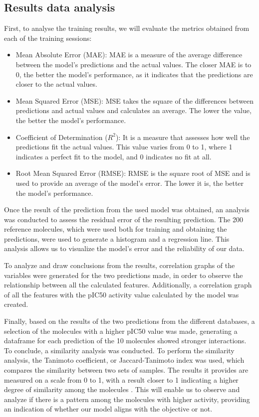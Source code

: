 \documentclass[final,times,twocolumn,article]{elsarticle}
\begin{document}
\subsection{Results data analysis}

First, to analyse the training results, we will evaluate the metrics obtained from each of the training sessions:

\begin{itemize}
    \item Mean Absolute Error (MAE): MAE is a measure of the average difference between the model's predictions and the actual values. The closer MAE is to 0, the better the model's performance, as it indicates that the predictions are closer to the actual values.
    \item Mean Squared Error (MSE): MSE takes the square of the differences between predictions and actual values and calculates an average. The lower the value, the better the model's performance. 
    \item Coefficient of Determination ($R^2$): It is a measure that assesses how well the predictions fit the actual values. This value varies from 0 to 1, where 1 indicates a perfect fit to the model, and 0 indicates no fit at all. 
    \item Root Mean Squared Error (RMSE): RMSE is the square root of MSE and is used to provide an average of the model's error. The lower it is, the better the model's performance. 
    \end{itemize}

Once the result of the prediction from the used model was obtained, an analysis was conducted to assess the residual error of the resulting prediction. The 200 reference molecules, which were used both for training and obtaining the predictions, were used to generate a histogram and a regression line. This analysis allows us to visualize the model's error and the reliability of our data. 

To analyze and draw conclusions from the results, correlation graphs of the variables were generated for the two predictions made, in order to observe the relationship between all the calculated features. Additionally, a correlation graph of all the features with the pIC50 activity value calculated by the model was created. 

Finally, based on the results of the two predictions from the different databases, a selection of the molecules with a higher pIC50 value was made, generating a dataframe for each prediction of the 10 molecules showed stronger interactions. To conclude, a similarity analysis was conducted. To perform the similarity analysis, the Tanimoto coefficient, or Jaccard-Tanimoto index was used, which compares the similarity between two sets of samples. The results it provides are measured on a scale from 0 to 1, with a result closer to 1 indicating a higher degree of similarity among the molecules \cite{Bajusz2015}. This will enable us to observe and analyze if there is a pattern among the molecules with higher activity, providing an indication of whether our model aligns with the objective or not. 
\end{document}
